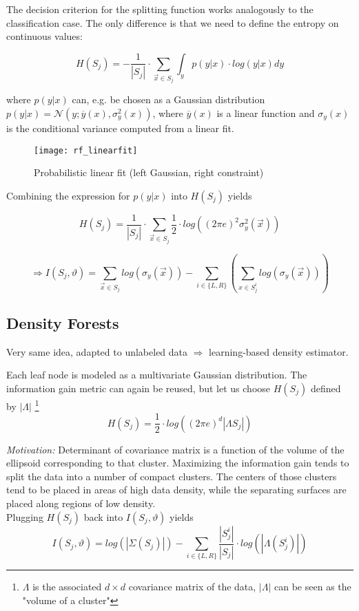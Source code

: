The decision criterion for the splitting function works analogously to the classification case. The only difference is that we need to define the entropy on continuous values:

\[H(S_j) = -\frac{1}{|S_j|} \cdot \sum_{\vec{x} \in S_j} \int_y p(y|x) \cdot log(y|x)dy\]

where \(p(y|x)\) can, e.g. be chosen as a Gaussian distribution \(p(y|x) = \mathcal{N}(y; \overline{y}(x), \sigma_y^2(x))\), where \(\overline{y}(x)\) is a linear function and \(\sigma_y(x)\) is the conditional variance computed from a linear fit.

\begin{figure}[H]
	\centering
    \texttt{[image: rf\_linearfit]}
    \caption{Probabilistic linear fit (left Gaussian, right constraint)}
\end{figure}

Combining the expression for \(p(y|x)\) into \(H(S_j)\) yields

\[H(S_j) = \frac{1}{|S_j|} \cdot \sum_{\vec{x} \in S_j} \frac{1}{2} \cdot log((2 \pi e)^2 \sigma_y^2(\vec{x}))\]

\[\Rightarrow I(S_j, \vartheta) = \sum_{\vec{x} \in S_j} log(\sigma_y(\vec{x})) - \sum_{i \in \{L, R\}} (\sum_{x \in S_j^i} log (\sigma_y(\vec{x}))) \]

\newpage
\subsection*{Density Forests}
Very same idea, adapted to unlabeled data $\Rightarrow$ learning-based density estimator.

Each leaf node is modeled as a multivariate Gaussian distribution. The information gain metric can again be reused, but let us choose \(H(S_j)\) defined by $|\Lambda|$ \footnote{$\Lambda$ is the associated $d \times d$ covariance matrix of the data, $|\Lambda|$  can be seen as the "volume of a cluster"}
\[
  H(S_j) = \frac{1}{2} \cdot log((2 \pi e)^d |\Lambda S_j|)
\]

\textit{Motivation:}
Determinant of covariance matrix is a function of the volume of the ellipsoid corresponding to that cluster. Maximizing the information gain tends to split the data into a number of compact clusters. The centers of those clusters tend to be placed in areas of high data density, while the separating surfaces are placed along regions of low density.\\

Plugging \(H(S_j)\) back into \(I(S_j, \vartheta)\) yields
\[I(S_j, \vartheta) = log (|\Sigma(S_j)|) - \sum_{i \in \{L, R\}} \frac{|S_j^i|}{|S_j|} \cdot log(|\Lambda(S_j^i)|)\]

